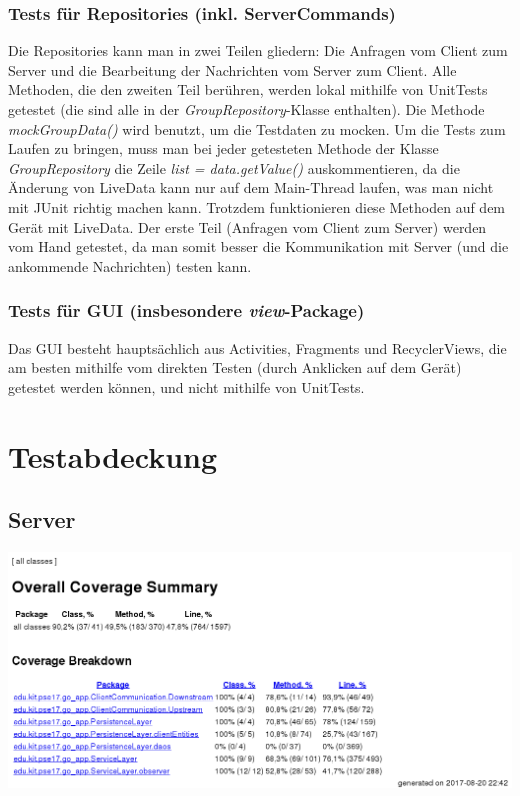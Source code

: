 \documentclass[11pt,a4paper]{scrartcl}
\begin{document}
\subsubsection{Tests für Repositories (inkl. ServerCommands)}
Die Repositories kann man in zwei Teilen gliedern: Die Anfragen vom Client zum Server und die Bearbeitung der Nachrichten vom Server zum Client. Alle Methoden, die den zweiten Teil berühren, werden lokal mithilfe von UnitTests getestet (die sind alle in der \textit{GroupRepository}-Klasse enthalten). Die Methode \textit{mockGroupData()} wird benutzt, um die Testdaten zu mocken. Um die Tests zum Laufen zu bringen, muss man bei jeder getesteten Methode der Klasse \textit{GroupRepository} die Zeile \textit{list = data.getValue()} auskommentieren, da die Änderung von LiveData kann nur auf dem Main-Thread laufen, was man nicht mit JUnit richtig machen kann. Trotzdem funktionieren diese Methoden auf dem Gerät mit LiveData.
Der erste Teil (Anfragen vom Client zum Server) werden vom Hand getestet, da man somit besser die Kommunikation mit Server (und die ankommende Nachrichten) testen kann.

\subsubsection{Tests für GUI (insbesondere \textit{view}-Package)}
Das GUI besteht hauptsächlich aus Activities, Fragments und RecyclerViews, die am besten mithilfe vom direkten Testen (durch Anklicken auf dem Gerät) getestet werden können, und nicht mithilfe von UnitTests. 


\newpage

\section{Testabdeckung}
\subsection{Server}


\begin{center}
	\includegraphics[width=1.0\linewidth]{ServerTestCoverage}
\end{center}
\end{document}
